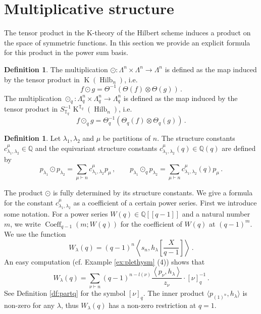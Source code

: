 \documentclass[12pt,a4paper]{amsart}
\theoremstyle{plain}
\theoremstyle{definition}
\newtheorem{df}[tw]{Definition}
\theoremstyle{remark}
\newcommand{\Hilb}[1]{\operatorname{Hilb}_{{#1}}}
\newcommand{\QQ}{\mathbb{Q}}
\newcommand{\Tq}{{\mathbb{T}_q}}
\newcommand{\Partq}[1]{[{#1}]_q}
\DeclareMathOperator{\KTh}{K}
\begin{document}
\section{Multiplicative structure} \label{s:mult}
The tensor product in the K-theory of the Hilbert scheme induces a product on the space of symmetric functions. In this section we provide an explicit formula for this product in the power sum basis. 
\begin{df}
	The multiplication $\odot:\Lambda^n\times\Lambda^n\to \Lambda^n$ is defined as the map induced by the tensor product in $\KTh(\Hilb{n})$, i.e.
	$$ f \odot g = \Theta^{-1}(\Theta(f)\otimes\Theta(g))\,.$$ 
	The multiplication $\odot_q:\Lambda_q^n\times\Lambda_q^n\to \Lambda_q^n$ is defined as the map induced by the tensor product in $S_\Tq^{-1}\KTh^\Tq(\Hilb{n})$, i.e.
	$$ f \odot_q g = \Theta_q^{-1}(\Theta_q(f)\otimes\Theta_q(g))\,.$$
\end{df}
 \begin{df}
 	Let $\lambda_1,\lambda_2$ and $\mu$ be partitions of $n$. The structure constants $c^\mu_{\lambda_1,\lambda_2} \in \QQ$ and the equivariant structure constants $c^\mu_{\lambda_1,\lambda_2}(q) \in \QQ(q)$ are defined by 
 	$$
 	p_{\lambda_1}\odot p_{\lambda_2}= \sum_{\mu\vdash n} c^\mu_{\lambda_1,\lambda_2} p_\mu\,,\qquad
 	p_{\lambda_1}\odot_q p_{\lambda_2}= \sum_{\mu\vdash n} c^\mu_{\lambda_1,\lambda_2}(q) p_\mu\,.
 	$$
 \end{df}
The product $\odot$ is fully determined by its structure constants. We give a formula for the constant $c^\mu_{\lambda_1,\lambda_2}$ as a coefficient of a certain power series. First we introduce some notation.
For a power series $W(q)\in \QQ[[q-1]]$ and a natural number $m$, we write
$\operatorname{Coeff}_{q-1}(m;W(q))$
for the coefficient of $W(q)$ at $(q-1)^m$. We use the function
$$W_\lambda(q)= (q-1)^n\left\langle s_n, h_\lambda\left[\frac{X}{q-1}\right]\right\rangle\,.$$
An easy computation (cf. Example \ref{ex:plethysm} (4)) shows that
$$W_\lambda(q)=\sum_{\nu\vdash n} (q-1)^{n-l(\nu)} \frac{\left\langle p_{\nu}, h_\lambda\right\rangle}{z_\nu} \cdot  \Partq{\nu}^{-1}\,.$$
 See Definition \ref{df:partq} for the symbol $\Partq{\nu}$.
 The inner product $\langle p_{(1)^n}, h_\lambda\rangle$ is non-zero for any $\lambda$, thus $W_\lambda(q)$ has a non-zero restriction at $q=1$.
\end{document}
